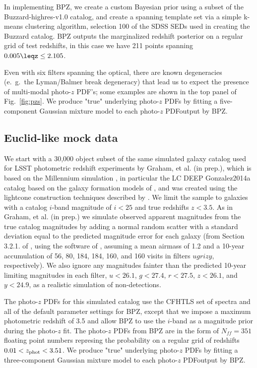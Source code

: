 \documentclass[\docopts]{\docclass}
\newcommand{\pz}{photo-$z$ PDF}
\begin{document}
In implementing BPZ, we create a custom Bayesian prior using a subset of the 
Buzzard-highres-v1.0 catalog, and create a spanning template set via a simple 
k-means clustering algorithm, selection 100 of the SDSS SEDs used in creating 
the Buzzard catalog.  BPZ outputs the marginalized redshift posterior on a 
regular grid of test redshifts, in this case we have 211 points spanning 
$0.005\leqz\leq2.105$.

Even with six filters spanning the optical, there are known degeneracies 
(e.~g.~the Lyman/Balmer break degeneracy) that lead us to expect the presence 
of multi-modal \pz's; some examples are shown in the top panel of 
Fig.~\ref{fig:pzs}.  We produce "true" underlying \pz s by fitting a 
five-component Gaussian mixture model to each \pz output by BPZ.


\subsection{Euclid-like mock data}
\label{sec:Euclid}


We start with a 30,000 object subset of the same simulated galaxy catalog used 
for LSST photometric redshift experiments by Graham, et al. (in prep.), which 
is based on the Millennium simulation \citep{springel_simulations_2005}, in 
particular the LC DEEP Gonzalez2014a  catalog 
based on the galaxy formation models of \cite{gonzalez-perez_how_2014}, and was 
created using the lightcone construction techniques described by 
\cite{merson_lightcone_2013}.  We limit the sample to galaxies with a catalog 
$i$-band magnitude of $i<25$ and true redshifts $z<3.5$. As in Graham, et al. 
(in prep.) we simulate observed apparent magnitudes from the true catalog 
magnitudes by adding a normal random scatter with a standard deviation equal to 
the predicted magnitude error for each galaxy (from Section 3.2.1. of 
\citealt{ivezic_lsst:_2008}, using the software of 
\citealt{connolly_end--end_2014}, assuming a mean airmass of 1.2 and a 10-year 
accumulation of 56, 80, 184, 184, 160, and 160 visits in filters $ugrizy$, 
respectively).  We also ignore any magnitudes fainter than the predicted 
10-year limiting magnitudes in each filter, $u<26.1$, $g<27.4$, $r<27.5$, 
$z<26.1$, and $y<24.9$, as a realistic simulation of non-detections.

The \pz s for this simulated catalog use the CFHTLS set of spectra 
\citep{ilbert_accurate_2006} and all of the default parameter settings for BPZ, 
except that we impose a maximum photometric redshift of 3.5 and allow BPZ to 
use the $i$-band as a magnitude prior during the photo-$z$ fit. The \pz s from 
BPZ are in the form of $N_{ff} = 351$ floating point numbers represing the 
probability on a regular grid of redshifts $0.01 < z_{\rm phot} < 3.51$.  We 
produce "true" underlying \pz s by fitting a three-component Gaussian mixture 
model to each \pz output by BPZ.
\end{document}
